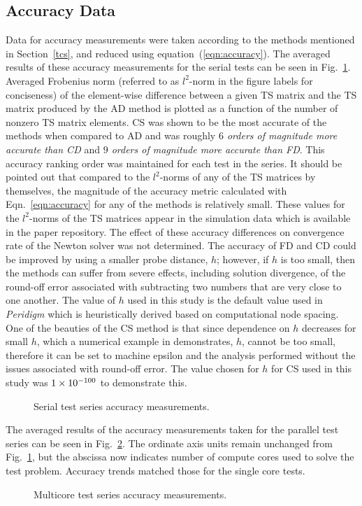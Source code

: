\documentclass[preprint,12pt]{elsarticle}
\begin{document}
\subsection{Accuracy Data}
Data for accuracy measurements were taken according to the methods mentioned in Section~\ref{tcs}, and reduced using equation~(\ref{eqn:accuracy}). The averaged results of these accuracy measurements for the serial tests can be seen in Fig.~\ref{fig:serial_accuracy}. Averaged Frobenius norm (referred to as $l^2$-norm in the figure labels for conciseness) of the element-wise difference between a given TS matrix and the TS matrix produced by the AD method is plotted as a function of the number of nonzero TS matrix elements. CS was shown to be the most accurate of the methods when compared to AD and was roughly \emph{$6$ orders of magnitude more accurate than CD} and \emph{$9$ orders of magnitude more accurate than FD}. This accuracy ranking order was maintained for each test in the series. It should be pointed out that compared to the $l^2$-norms of any of the TS matrices by themselves, the magnitude of the accuracy metric calculated with Eqn.~\ref{eqn:accuracy} for any of the methods is relatively small. These values for the $l^2$-norms of the TS matrices appear in the simulation data which is available in the paper repository. The effect of these accuracy differences on convergence rate of the Newton solver was not determined.  
%
The accuracy of FD and CD could be improved by using a smaller probe distance, $h$; however, if $h$ is too small, then the methods can suffer from severe effects, including solution divergence, of the round-off error associated with subtracting two numbers that are very close to one another.  The value of $h$ used in this study is the default value used in \emph{Peridigm} which is heuristically derived based on computational node spacing.  One of the beauties of the CS method is that since dependence on $h$ decreases for small $h$, which a numerical example in \cite[Table 1]{squire1998using} demonstrates, $h$, cannot be too small, therefore it can be set to machine epsilon and the analysis performed without the issues associated with round-off error. The value chosen for $h$ for CS used in this study was $\num{1.E-100}$ to demonstrate this.
%
\begin{figure}[tbp]
  \centering
  \scalebox{1.0}{}
  \caption{Serial test series accuracy measurements.}
  \label{fig:serial_accuracy}
\end{figure}
%
The averaged results of the accuracy measurements taken for the parallel test series can be seen in Fig.~\ref{fig:multi_accuracy}. The ordinate axis units remain unchanged from Fig.~\ref{fig:serial_accuracy}, but the abscissa now indicates number of compute cores used to solve the test problem. Accuracy trends matched those for the single core tests. 
%
\begin{figure}[tbp]
  \centering
  \scalebox{1.0}{}
  \caption{Multicore test series accuracy measurements.}
  \label{fig:multi_accuracy}
\end{figure}
\end{document}
